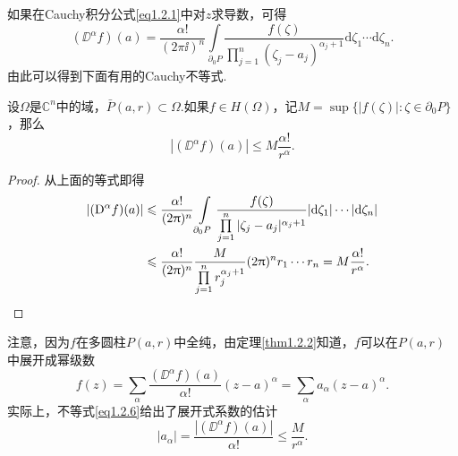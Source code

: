 如果在Cauchy积分公式\eqref{eq1.2.1}中对$z$求导数，可得
\[(\DD^\alpha f)(a)=\frac{\alpha!}{(2\pi\ii)^n}\int\limits_{\partial_0 P}\frac{f(\zeta)}{\prod\limits_{j=1}^{n}(\zeta_j-a_j)^{\alpha_j+1}}\mathrm{d}\zeta_1\cdots\mathrm{d}\zeta_n.\]
由此可以得到下面有用的Cauchy不等式.
\begin{theorem}\label{thm1.2.3}
	设$\Omega$是$\mathbb{C}^n$中的域，$\bar{P}(a,r)\subset\Omega.$如果$f\in H(\Omega)$，记$M=\sup\{|f(\zeta)|:\zeta\in\partial_0 P\}$，那么
	\begin{equation}\label{eq1.2.6}
		|(\DD^\alpha f)(a)|\le M\frac{\alpha!}{r^\alpha}.
	\end{equation}
\end{theorem}
\begin{proof}
	从上面的等式即得
	\begin{align*}
		|(\mathrm D^\alpha f)(a)|
		&\leqslant \frac{\alpha!}{(2\uppi)^n}\int\limits_{\partial_0 P}\frac{f(\zeta)}{\prod\limits_{j=1}^{n}|\zeta_j-a_j|^{\alpha_j+1}}|\mathrm{d}\zeta_1|\cdots|\mathrm{d}\zeta_n|\\
		&\leqslant\frac{\alpha!}{(2\uppi)^n}\frac{M}{\prod\limits_{j=1}^{n}r_j^{\alpha_j+1}}(2\uppi)^n r_1\cdots r_n=M\frac{\alpha!}{r^\alpha}.\qedhere
	\end{align*}
\end{proof}
注意，因为$f$在多圆柱$P(a,r)$中全纯，由定理\ref{thm1.2.2}知道，$f$可以在$P(a,r)$中展开成幂级数
\[f(z)=\sum_\alpha\frac{(\DD^\alpha f)(a)}{\alpha!}(z-a)^\alpha=\sum_\alpha a_\alpha (z-a)^\alpha .\]
实际上，不等式\eqref{eq1.2.6}给出了展开式系数的估计
\[|a_\alpha|=\frac{|(\DD^\alpha f)(a)|}{\alpha!}\le \frac{M}{r^\alpha}.\]
